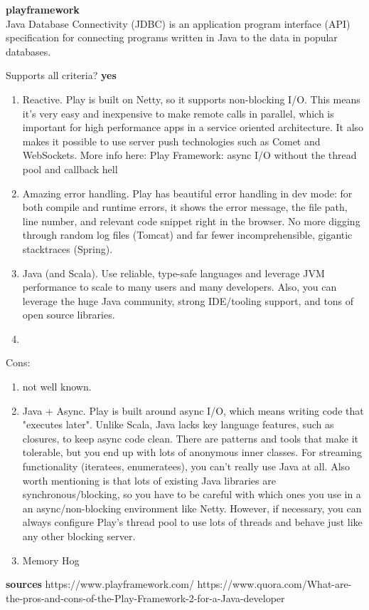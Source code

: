 
\textbf{playframework} \\
Java Database Connectivity (JDBC) is an application program interface (API) specification for connecting programs written in Java to the data in popular databases.

Supports all criteria?
\textbf{yes}

\begin{enumerate}
	\item Reactive. Play is built on Netty, so it supports non-blocking I/O. This means it's very easy and inexpensive to make remote calls in parallel, which is important for high performance apps in a service oriented architecture. It also makes it possible to use server push technologies such as Comet and WebSockets. More info here: Play Framework: async I/O without the thread pool and callback hell 
	\item Amazing error handling. Play has beautiful error handling in dev mode: for both compile and runtime errors, it shows the error message, the file path, line number, and relevant code snippet right in the browser. No more digging through random log files (Tomcat) and far fewer incomprehensible, gigantic stacktraces (Spring).
	\item Java (and Scala). Use reliable, type-safe languages and leverage JVM performance to scale to many users and many developers. Also, you can leverage the huge Java community, strong IDE/tooling support, and tons of open source libraries.
	\item 
\end{enumerate}
Cons:
\begin{enumerate}
	\item not well known.
	\item Java + Async. Play is built around async I/O, which means writing code that "executes later". Unlike Scala, Java lacks key language features, such as closures, to keep async code clean. There are patterns and tools that make it tolerable, but you end up with lots of anonymous inner classes. For streaming functionality (iteratees, enumeratees), you can't really use Java at all. Also worth mentioning is that lots of existing Java libraries are synchronous/blocking, so you have to be careful with which ones you use in a an async/non-blocking environment like Netty. However, if necessary, you can always configure Play's thread pool to use lots of threads and behave just like any other blocking server.
	\item Memory Hog
\end{enumerate}

\textbf{sources}
https://www.playframework.com/
https://www.quora.com/What-are-the-pros-and-cons-of-the-Play-Framework-2-for-a-Java-developer